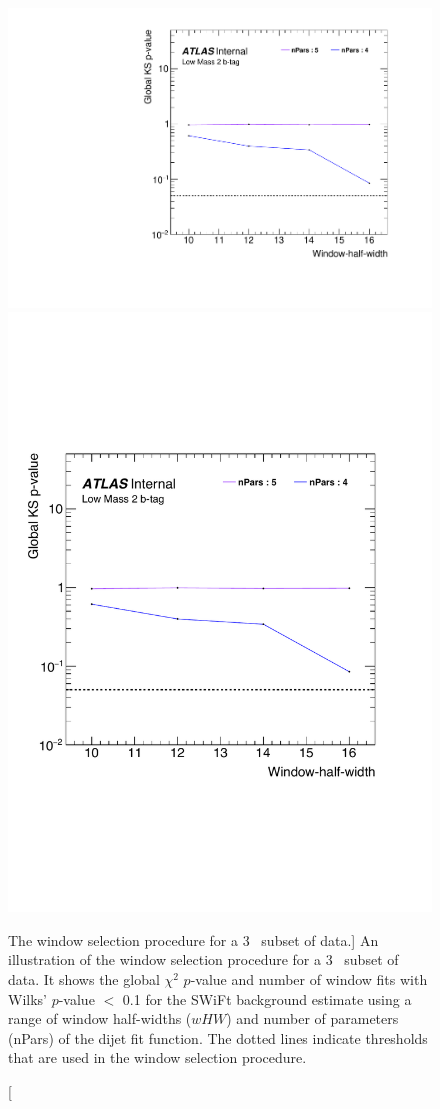 \begin{figure}[!htb]
\captionsetup[subfigure]{aboveskip=0pt,justification=centering}
\centering
{} {
  \includegraphics[width=0.45\linewidth, angle=0,page=2]{figs/Dibjet/LowMass/FitStudy_min566/windowSel_subset.pdf}
}\hspace{-8mm}
 {
  \includegraphics[width=0.42\linewidth, angle=0,page=4]{figs/Dibjet/LowMass/FitStudy_min566/windowSel_subset_edited.pdf}
}

\vspace{-0.5em}
\caption
    [The window selection procedure for a 3~\ifb{} subset of \lm{} data.]
    {\label{fig:windowSel_subset}
      An illustration of the window selection procedure for a 3~\ifb{} subset of \lm{} data.
      It shows the global $\chi^{2}$ \mbox{$p$-value}
      and number of window fits with Wilks' \mbox{$p$-value} $<$ 0.1 for the SWiFt background estimate
      using a range of window half-widths ($wHW$) and number of parameters (nPars) of the dijet fit function.
      The dotted lines indicate thresholds that are used in the window selection procedure.
    }
\vspace{-1em}
\end{figure}

